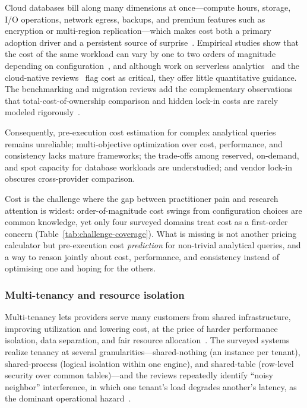 \documentclass[a4paper,fleqn]{cas-sc}
\begin{document}
Cloud databases bill along many dimensions at once---compute hours, storage, I/O operations, network egress, backups, and premium features such as encryption or multi-region replication---which makes cost both a primary adoption driver and a persistent source of surprise~\cite{Leis2023CloudPricing}. Empirical studies show that the cost of the same workload can vary by one to two orders of magnitude depending on configuration~\cite{Leis2023CloudPricing}, and although work on serverless analytics~\cite{Muller2020Serverless} and the cloud-native reviews~\cite{Li2024CloudNativeSurvey} flag cost as critical, they offer little quantitative guidance. The benchmarking and migration reviews add the complementary observations that total-cost-of-ownership comparison and hidden lock-in costs are rarely modeled rigorously~\cite{Taipalus2024DBMSPerf,Mathew2021CloudMigration}.

Consequently, pre-execution cost estimation for complex analytical queries remains unreliable; multi-objective optimization over cost, performance, and consistency lacks mature frameworks; the trade-offs among reserved, on-demand, and spot capacity for database workloads are understudied; and vendor lock-in obscures cross-provider comparison.

Cost is the challenge where the gap between practitioner pain and research attention is widest: order-of-magnitude cost swings from configuration choices are common knowledge, yet only four surveyed domains treat cost as a first-order concern (Table~\ref{tab:challenge-coverage}). What is missing is not another pricing calculator but pre-execution cost \emph{prediction} for non-trivial analytical queries, and a way to reason jointly about cost, performance, and consistency instead of optimising one and hoping for the others.

\subsubsection{Multi-tenancy and resource isolation}
\label{subsubsec:multitenancy}

Multi-tenancy lets providers serve many customers from shared infrastructure, improving utilization and lowering cost, at the price of harder performance isolation, data separation, and fair resource allocation~\cite{Li2024CloudNativeSurvey}. The surveyed systems realize tenancy at several granularities---shared-nothing (an instance per tenant), shared-process (logical isolation within one engine), and shared-table (row-level security over common tables)---and the reviews repeatedly identify ``noisy neighbor'' interference, in which one tenant's load degrades another's latency, as the dominant operational hazard~\cite{Narasayya2015MultiTenant}.
\end{document}
